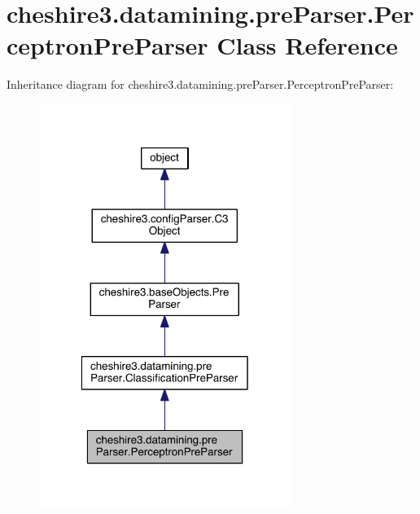 \hypertarget{classcheshire3_1_1datamining_1_1pre_parser_1_1_perceptron_pre_parser}{\section{cheshire3.\-datamining.\-pre\-Parser.\-Perceptron\-Pre\-Parser Class Reference}
\label{classcheshire3_1_1datamining_1_1pre_parser_1_1_perceptron_pre_parser}
}


Inheritance diagram for cheshire3.\-datamining.\-pre\-Parser.\-Perceptron\-Pre\-Parser\-:
\nopagebreak
\begin{figure}[H]
\begin{center}
\leavevmode
\includegraphics[width=232pt]{classcheshire3_1_1datamining_1_1pre_parser_1_1_perceptron_pre_parser__inherit__graph}
\end{center}
\end{figure}


